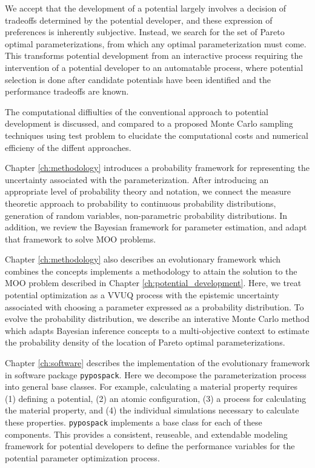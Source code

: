 We accept that the development of a potential largely involves a decision of tradeoffs determined by the potential developer, and these expression of preferences is inherently subjective.  Instead, we search for the set of Pareto optimal parameterizations, from which any optimal parameterization must come.  This transforms potential development from an interactive process requiring the intervention of a potential developer to an automatable process, where potential selection is done after candidate potentials  have been identified and the performance tradeoffs are known.

The computational diffiulties of the conventional approach to potential development is discussed, and compared to a proposed Monte Carlo sampling techniques using test problem to elucidate the computational costs and numerical efficieny of the diffent approaches.

Chapter \ref{ch:methodology}  introduces a probability framework for representing the uncertainty associated with the parameterization.   After introducing an appropriate level of probability theory and notation, we connect the measure theoretic approach to probability to continuous probability distributions, generation of random variables, non-parametric probability distributions.  In addition, we review the Bayesian framework for parameter estimation, and adapt that framework to solve MOO problems.

Chapter \ref{ch:methodology} also describes an evolutionary framework which combines the concepts implements a methodology to attain the solution to the MOO problem described in Chapter \ref{ch:potential_development}.  Here, we treat potential optimization as a VVUQ process with the epistemic uncertainty associated with choosing a parameter expressed as a probability distribution.  To evolve the probability distribution, we describe an interative Monte Carlo method which adapts Bayesian inference concepts to a multi-objective context to estimate the probability density of the location of Pareto optimal parameterizations.

Chapter \ref{ch:software} describes the implementation of the evolutionary framework in software package \verb|pypospack|.  Here we decompose the parameterization process into general base classes.  For example, calculating a material property requires (1) defining a potential, (2) an atomic configuration, (3) a process for calculating the material property, and (4) the individual simulations necessary to calculate these properties.  \verb|pypospack| implements a base class for each of these components.  This provides a consistent, reuseable, and extendable modeling framework for potential developers to define the performance variables for the potential parameter optimization process.

